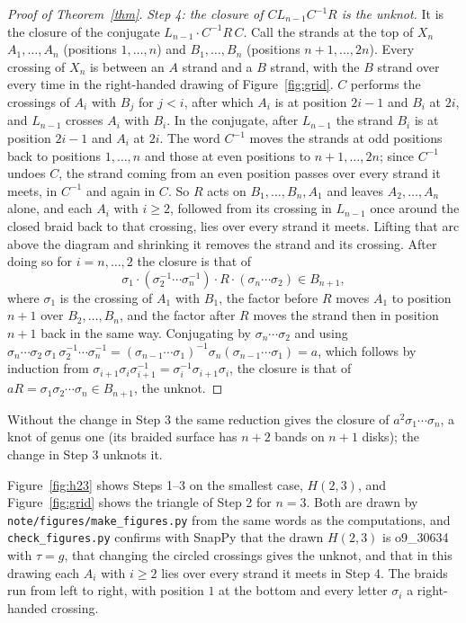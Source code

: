 \documentclass[11pt]{article}
\begin{document}
\begin{proof}[Proof of Theorem~\ref{thm}]
\emph{Step 4: the closure of $C L_{n-1} C^{-1} R$ is the unknot.} It is the closure of the conjugate
$L_{n-1}\cdot C^{-1} R\, C$. Call the strands at the top of $X_n$ $A_1, \dots, A_n$ (positions $1, \dots, n$) and
$B_1, \dots, B_n$ (positions $n+1, \dots, 2n$). Every crossing of $X_n$ is between an $A$ strand and a $B$ strand, with
the $B$ strand over every time in the right-handed drawing of Figure~\ref{fig:grid}. $C$ performs the crossings of $A_i$ with $B_j$ for $j < i$, after
which $A_i$ is at position $2i-1$ and $B_i$ at $2i$, and $L_{n-1}$ crosses $A_i$ with $B_i$. In the conjugate, after
$L_{n-1}$ the strand $B_i$ is at position $2i-1$ and $A_i$ at $2i$. The word $C^{-1}$ moves the strands at odd positions
back to positions $1, \dots, n$ and those at even positions to $n+1, \dots, 2n$; since $C^{-1}$ undoes $C$, the strand
coming from an even position passes over every strand it meets, in $C^{-1}$ and again in $C$. So $R$ acts on
$B_1, \dots, B_n, A_1$ and leaves $A_2, \dots, A_n$ alone, and each $A_i$ with $i \ge 2$, followed from its crossing in
$L_{n-1}$ once around the closed braid back to that crossing, lies over every strand it meets. Lifting that arc above
the diagram and shrinking it removes the strand and its crossing. After doing so for $i = n, \dots, 2$ the closure is
that of
\[ \sigma_1\cdot(\sigma_2^{-1}\cdots\sigma_n^{-1})\cdot R\cdot(\sigma_n\cdots\sigma_2) \in B_{n+1}, \]
where $\sigma_1$ is the crossing of $A_1$ with $B_1$, the factor before $R$ moves $A_1$ to position $n+1$ over
$B_2, \dots, B_n$, and the factor after $R$ moves the strand then in position $n+1$ back in the same way. Conjugating by $\sigma_n\cdots\sigma_2$ and using
$\sigma_n\cdots\sigma_2\,\sigma_1\,\sigma_2^{-1}\cdots\sigma_n^{-1} = (\sigma_{n-1}\cdots\sigma_1)^{-1}\sigma_n(\sigma_{n-1}\cdots\sigma_1) = a$,
which follows by induction from $\sigma_{i+1}\sigma_i\sigma_{i+1}^{-1} = \sigma_i^{-1}\sigma_{i+1}\sigma_i$, the closure is
that of $a R = \sigma_1\sigma_2\cdots\sigma_n \in B_{n+1}$, the unknot.
\end{proof}

\noindent Without the change in Step 3 the same reduction gives the closure of $a^2\sigma_1\cdots\sigma_n$, a knot of
genus one (its braided surface has $n+2$ bands on $n+1$ disks); the change in Step 3 unknots it.

Figure~\ref{fig:h23} shows Steps 1--3 on the smallest case, $H(2,3)$, and Figure~\ref{fig:grid} shows the triangle of
Step 2 for $n = 3$. Both are drawn by \texttt{note/figures/make\_figures.py} from the same words as the computations, and
\texttt{check\_figures.py} confirms with SnapPy that the drawn $H(2,3)$ is o9\_30634 with $\tau = g$, that changing the
circled crossings gives the unknot, and that in this drawing each $A_i$ with $i \ge 2$ lies over every strand it meets in
Step 4. The braids run from left to right, with position $1$ at the bottom and every letter $\sigma_i$ a right-handed
crossing.
\end{document}
